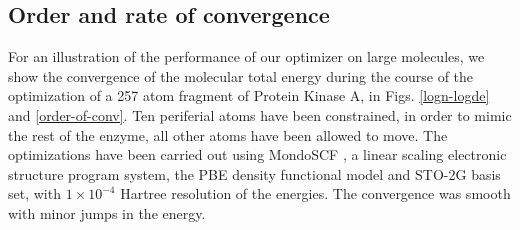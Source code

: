\documentclass[prl,twocolumn,showpacs,twocolumngrid,superbib]{revtex4}
\begin{document}
\subsection{Order and rate of convergence}
For an illustration of the performance of our optimizer on large
molecules, we show the convergence of the molecular total energy
during the course of the optimization of a 257 atom
fragment of Protein Kinase A, in Figs. \ref{logn-logde} 
and \ref{order-of-conv}. Ten periferial atoms have been 
constrained, in order to mimic the rest of the enzyme, 
all other atoms have been allowed to move.
The optimizations have been carried out 
using MondoSCF \cite{MondoSCF}, a linear scaling electronic structure
program system, the PBE density functional model and 
STO-2G basis set, with $1\times10^{-4}$ Hartree resolution of the energies.
The convergence was smooth with minor jumps in the energy.
\end{document}
